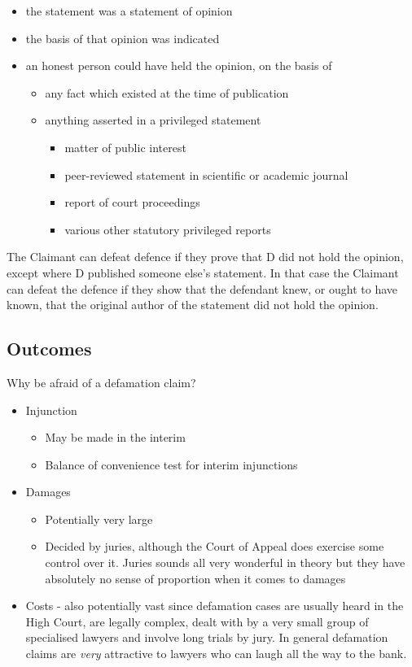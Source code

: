 \documentclass[]{article}
\begin{document}
\begin{itemize}
\item the statement was a statement of opinion 
\item the basis of that opinion was indicated
\item an honest person could have held the opinion, on the basis of
  \begin{itemize}
  \item any fact which existed at the time of publication
  \item anything asserted in a privileged statement
    \begin{itemize}
    \item matter of public interest
    \item peer-reviewed statement in scientific or academic journal
    \item report of court proceedings
    \item various other statutory privileged reports
    \end{itemize}
  \end{itemize}

\end{itemize}

The Claimant can defeat defence if they prove that D did not hold the opinion, except where D published someone else's statement. In that case the Claimant can defeat the defence if they show that the defendant knew, or ought to have known, that the original author of the statement did not hold the opinion.

\subsection{Outcomes}

Why be afraid of a defamation claim?

\begin{itemize}
\item
  Injunction

  \begin{itemize}
  \item
    May be made in the interim
  \item
    Balance of convenience test for interim injunctions
  \end{itemize}
\item
  Damages

  \begin{itemize}
  \item
    Potentially very large
  \item
    Decided by juries, although the Court of Appeal does exercise some
    control over it. Juries sounds all very wonderful in theory but they
    have absolutely no sense of proportion when it comes to damages
  \end{itemize}
\item
  {{Costs - also potentially vast since defamation cases are usually
  heard in the High Court, are legally complex, dealt with by a very
  small group of specialised lawyers and involve long trials by jury. In
  general defamation claims are }}\emph{{very }}{{attractive to lawyers
  who can laugh all the way to the bank.}}
\end{itemize}
\end{document}
